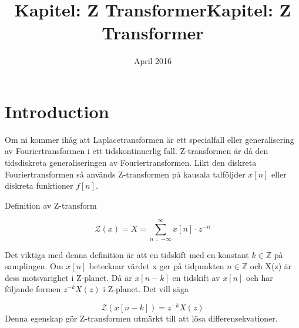 \documentclass{article}
\title{Kapitel: Z Transformer}
\author{ }
\date{April 2016}
\title{Kapitel: Z Transformer}
\begin{document}
\maketitle

\section{Introduction}

Om ni kommer ihåg att Laplacetransformen är ett specialfall eller generalisering av Fouriertransformen i ett
tidskontinuerlig fall. Z-transformen är då den tidsdiskreta generaliseringen av Fouriertransformen.
Likt den diskreta Fouriertransformen så används Z-transformen på kausala talföljder $x[n]$ eller
diskreta funktioner $f[n]$. %

Definition av Z-transform

$$\mathcal{Z}(x) = X = \sum_{n=-\infty}^{\infty} x[n] \cdot z^{-n} $$

Det viktiga med denna definition är att en tidskift med en konstant $k \in \mathbb{Z}$ på samplingen. Om $x[n]$ betecknar värdet x ger på tidpunkten $n \in \mathbb{Z}$ och X(z) är dess motsvarighet i Z-planet. Då är $x[n-k]$ en tidskift av $x[n]$ och har följande formen $z^{-k} X(z)$ i  Z-planet. Det vill säga


$$\mathcal{Z}(x[n-k]) = z^{-k} X(z) $$
Denna egenskap gör Z-transformen utmärkt till att lösa differensekvationer.


\appendix
\end{document}
